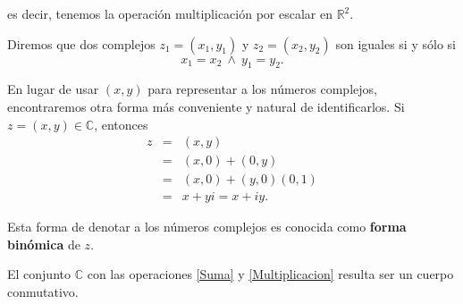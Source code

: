 es decir, tenemos la operación multiplicación por escalar en $\mathbb{R}^2$.

\begin{defi}
Diremos que dos complejos $z_1 = (x_1,y_1)$ y $z_2 = (x_2, y_2)$ son iguales si y sólo si
$$x_1 = x_2 ~\wedge~ y_1 = y_2.$$
\end{defi}

En lugar de usar $(x,y)$  para representar a los números complejos, encontraremos otra forma más conveniente y natural de identificarlos. 
Si $z = (x,y) \in \mathbb{C}$, entonces
\begin{eqnarray*}
z &=& (x,y) \\
&=& (x,0) + (0,y) \\
&=& (x,0) + (y,0) (0,1) \\
&=& x + yi = x+iy.
\end{eqnarray*}

Esta forma de denotar a los números complejos es conocida como \textbf{forma binómica} de $z$.

\begin{teorema}
El conjunto $\mathbb{C}$ con las operaciones \eqref{Suma} y \eqref{Multiplicacion} resulta ser un cuerpo conmutativo.
\end{teorema}

